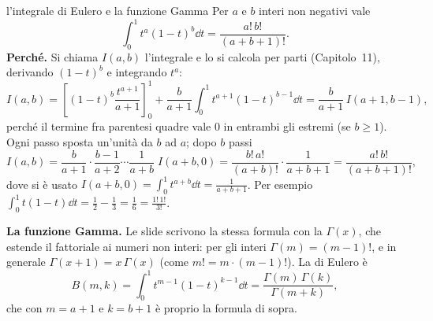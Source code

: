 \begin{richiamo}{l'integrale di Eulero e la funzione Gamma}
Per $a$ e $b$ interi non negativi vale
\[ \int_0^1 t^{a} (1 - t)^{b} \dd t = \frac{a!\, b!}{(a + b + 1)!} . \]
\textbf{Perché.} Si chiama $I(a, b)$ l'integrale e lo si calcola per parti (Capitolo~11), derivando $(1 - t)^b$ e
integrando $t^a$:
\[ I(a, b) = \left[ (1 - t)^b \frac{t^{a + 1}}{a + 1} \right]_0^1 + \frac{b}{a + 1} \int_0^1 t^{a + 1} (1 - t)^{b - 1}
   \dd t = \frac{b}{a + 1}\, I(a + 1, b - 1) , \]
perché il termine fra parentesi quadre vale 0 in entrambi gli estremi (se $b \geq 1$). Ogni passo sposta un'unità da
$b$ ad $a$; dopo $b$ passi
\[ I(a, b) = \frac{b}{a + 1} \cdot \frac{b - 1}{a + 2} \cdots \frac{1}{a + b}\; I(a + b, 0) = \frac{b!\, a!}{(a + b)!}
   \cdot \frac{1}{a + b + 1} = \frac{a!\, b!}{(a + b + 1)!} , \]
dove si è usato $I(a + b, 0) = \int_0^1 t^{a+b} \dd t = \frac{1}{a + b + 1}$. Per esempio $\int_0^1 t (1 - t) \dd t =
\frac12 - \frac13 = \frac16 = \frac{1!\, 1!}{3!}$.

\textbf{La funzione Gamma.} Le slide scrivono la stessa formula con la  $\Gamma(x)$,
che estende il fattoriale ai numeri non interi: per gli interi $\Gamma(m) = (m - 1)!$, e in generale $\Gamma(x + 1) =
x\, \Gamma(x)$ (come $m! = m \cdot (m - 1)!$). La  di Eulero è
\[ B(m, k) = \int_0^1 t^{m - 1} (1 - t)^{k - 1} \dd t = \frac{\Gamma(m)\, \Gamma(k)}{\Gamma(m + k)} , \]
che con $m = a + 1$ e $k = b + 1$ è proprio la formula di sopra.
\end{richiamo}


